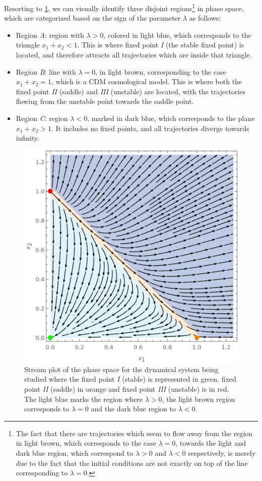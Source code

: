 Resorting to \cref{fig:dynamical-system}, we can visually identify three disjoint regions\footnote{The fact that there are trajectories which seem to flow away from the region in light brown, which corresponds to the case $\lambda = 0$, towards the light and dark blue region, which correspond to $\lambda > 0$ and $\lambda < 0$ respectively, is merely due to the fact that the initial conditions are not exactly on top of the line corresponding to $\lambda = 0$.} in phase space, which are categorized based on the sign of the parameter $\lambda$ as follows:
\begin{itemize}
    \item Region \textit{A}: region with $\lambda > 0$, colored in light blue, which corresponds to the triangle $x_1 + x_2 < 1$. This is where fixed point \textit{I} (the stable fixed point) is located, and therefore attracts all trajectories which are inside that triangle.
    \item Region \textit{B}: line with $\lambda = 0$, in light brown, corresponding to the case $x_1 + x_2 = 1$, which is a \gls{CDM} cosmological model. This is where both the fixed point \textit{II} (saddle) and \textit{III} (unstable) are located, with the trajectories flowing from the unstable point towards the saddle point.
    \item Region \textit{C}: region $\lambda < 0$, marked in dark blue, which corresponds to the plane $x_1 + x_2 > 1$. It includes no fixed points, and all trajectories diverge towards infinity.
\end{itemize}

\begin{figure}[h!]
    \centering
    \includegraphics[width=0.6\columnwidth]{figures/dynamical-system.png}
    \caption[Stream plot of the phase space for the dynamical system of a cosmological model with a function $f(Q)$ that replicates dark energy.]
    {Stream plot of the phase space for the dynamical system being studied where the fixed point \textit{I} (stable) is represented in green, fixed point \textit{II} (saddle) in orange and fixed point \textit{III} (unstable) is in red. The light blue marks the region where $\lambda > 0$, the light brown region corresponds to $\lambda = 0$ and the dark blue region to $\lambda < 0$.}
    \label{fig:dynamical-system}
\end{figure}

